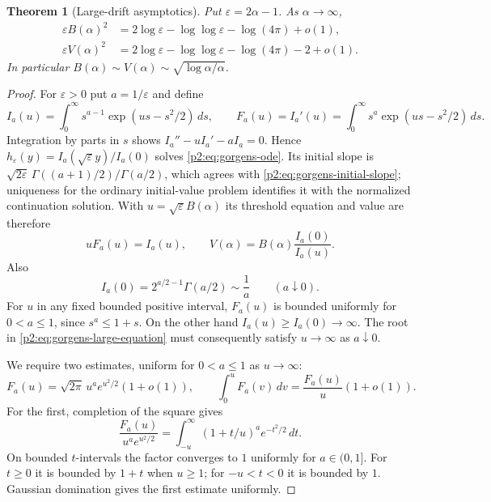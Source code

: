 \documentclass[11pt,a4paper]{article}
\newtheorem{theorem}{Theorem}[section]
\theoremstyle{definition}
\theoremstyle{remark}
\numberwithin{equation}{section}
\begin{document}
\begin{theorem}[Large-drift asymptotics]\label{p2:thm:gorgens-large-drift}
Put $\varepsilon=2\alpha-1$. As $\alpha\to\infty$,
\begin{align}
 \varepsilon B(\alpha)^2
   &=2\log\varepsilon-\log\log\varepsilon-\log(4\pi)+o(1),
          \label{p2:eq:gorgens-large-B}\\
 \varepsilon V(\alpha)^2
   &=2\log\varepsilon-\log\log\varepsilon-\log(4\pi)-2+o(1).
          \label{p2:eq:gorgens-large-V}
\end{align}
In particular
$B(\alpha)\sim V(\alpha)\sim\sqrt{\log\alpha/\alpha}$.
\end{theorem}
\begin{proof}
For $\varepsilon>0$ put $a=1/\varepsilon$ and define
\[
 I_a(u)=\int_0^\infty s^{a-1}\exp(us-s^2/2)\,ds,
 \qquad F_a(u)=I_a'(u)
        =\int_0^\infty s^a\exp(us-s^2/2)\,ds.
\]
Integration by parts in $s$ shows
$I_a''-uI_a'-aI_a=0$. Hence
$h_\varepsilon(y)=I_a(\sqrt\varepsilon y)/I_a(0)$
solves \eqref{p2:eq:gorgens-ode}. Its initial slope is
$\sqrt{2\varepsilon}\,\Gamma((a+1)/2)/\Gamma(a/2)$,
which agrees with \eqref{p2:eq:gorgens-initial-slope}; uniqueness for
the ordinary initial-value problem identifies it with the normalized
continuation solution. With $u=\sqrt\varepsilon B(\alpha)$ its threshold equation
and value are therefore
\begin{equation}\label{p2:eq:gorgens-large-equation}
 uF_a(u)=I_a(u),\qquad
 V(\alpha)=B(\alpha)\frac{I_a(0)}{I_a(u)}.
\end{equation}
Also
\[
 I_a(0)=2^{a/2-1}\Gamma(a/2)\sim\frac1a\qquad(a\downarrow0).
\]
For $u$ in any fixed bounded positive interval, $F_a(u)$ is bounded
uniformly for $0<a\leq1$, since $s^a\leq1+s$. On the other hand
$I_a(u)\geq I_a(0)\to\infty$. The root in
\eqref{p2:eq:gorgens-large-equation} must consequently satisfy
$u\to\infty$ as $a\downarrow0$.

We require two estimates, uniform for $0<a\leq1$ as $u\to\infty$:
\begin{equation}\label{p2:eq:gorgens-laplace-estimates}
 F_a(u)=\sqrt{2\pi}\,u^a e^{u^2/2}(1+o(1)),
 \qquad
 \int_0^uF_a(v)\,dv=\frac{F_a(u)}u(1+o(1)).
\end{equation}
For the first, completion of the square gives
\[
 \frac{F_a(u)}{u^ae^{u^2/2}}
 =\int_{-u}^\infty(1+t/u)^a e^{-t^2/2}\,dt.
\]
On bounded $t$-intervals the factor converges to $1$ uniformly for
$a\in(0,1]$. For $t\geq0$ it is bounded by $1+t$ when $u\geq1$;
for $-u<t<0$ it is bounded by $1$. Gaussian domination gives the
first estimate uniformly.


\end{proof}
\end{document}

